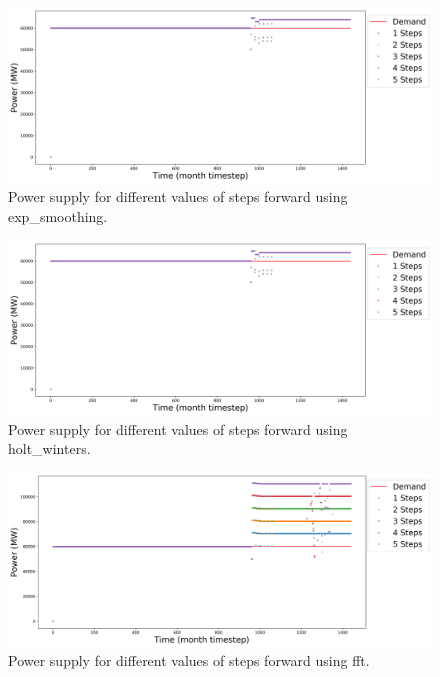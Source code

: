 \documentclass[11pt]{article}
\begin{document}
\begin{figure}[H]
	\centering
	\includegraphics[width=\textwidth]{29-figures/29-power-buffer0-exp_smoothing-steps.png} 
	\hfill
	\caption{Power supply for different values of steps forward using exp\_smoothing.}
	\label{fig:29-ste-exp_smoothing}
\end{figure}

\begin{figure}[H]
	\centering
	\includegraphics[width=\textwidth]{29-figures/29-power-buffer0-holt_winters-steps.png} 
	\hfill
	\caption{Power supply for different values of steps forward using holt\_winters.}
	\label{fig:29-ste-hots_winters}
\end{figure}

\begin{figure}[H]
	\centering
	\includegraphics[width=\textwidth]{29-figures/29-power-buffer0-fft-steps.png} 
	\hfill
	\caption{Power supply for different values of steps forward using fft.}
	\label{fig:29-ste-fft}
\end{figure}
\end{document}
